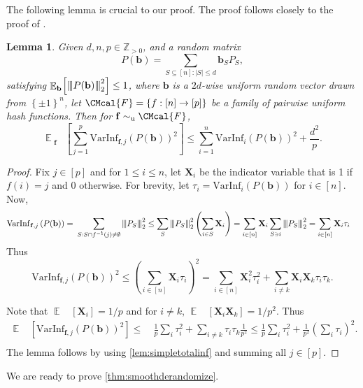 \documentclass[10pt,a4paper]{article}
\def\F{\CMcal{F}}
\theoremstyle{plain}
\newtheorem{lemma}[theorem]{Lemma}
\theoremstyle{definition}
\newcommand {\minusspace} {\: \! \!}
\newcommand {\Fn} [2] {\ensuremath{ #1 \minusspace \Br{ #2 } }}
\newcommand {\set} [1] {\ensuremath{ \left\lbrace #1 \right\rbrace }}
\newcommand {\br} [1] {\ensuremath{ \left( #1 \right) }}
\newcommand {\Br} [1] {\ensuremath{ \left[ #1 \right] }}
\newcommand {\ab} [1] {\ensuremath{ \left| #1 \right| }}
\DeclareMathOperator*{\bigE}{\mathbb{E}}
\newcommand {\expec} [2] {\Fn{\bigE_{\substack{#1}}}{#2}}
\newcommand{\nnorm}[1]{{\left\vert\kern-0.25ex\left\vert\kern-0.25ex\left\vert #1
		\right\vert\kern-0.25ex\right\vert\kern-0.25ex\right\vert}}
\newcommand{\posint}{{\mathbb Z}_{>0}}
\newcommand{\randb}{\ensuremath{\mathbf{b}}}
\newcommand{\randf}{\ensuremath{\mathbf{f}}}
\newcommand{\randX}{\ensuremath{\mathbf{X}}}
\newcommand{\varinfi}[1]{\ensuremath{\mathrm{VarInf}_i}\br{#1}}
\newcommand{\infrfj}[1]{\ensuremath{\mathrm{VarInf}_{\randf,j}}\br{#1}}
\newcommand{\invf}[1]{\ensuremath{f^{-1}\br{#1}}}
\newcommand{\usim}{\ensuremath{\sim_{\mathrm{u}}}}
\newcommand{\1}{\mathbb{1}} %
\begin{document}
The following lemma is crucial to our proof. The proof follows closely to the proof of \cite[Lemma 5.4]{10.1145/1806689.1806749}.

\begin{lemma}\label{fact:totalinfsqr}
Given $d,n,p\in\posint$, and a random matrix
\[P(\randb)=\sum_{S\subseteq[n]:\ab{S}\leq d}\randb_SP_S,\]
satisfying $\expec{\randb}{\nnorm{P(\randb)}_2^2}\leq1$, 
where $\randb$ is a $2d$-wise uniform random vector drawn from $\set{\pm 1}^n$, let $\F=\set{f:[n]\to[p]}$ be a family of pairwise uniform hash functions. Then for $\randf\usim\F$,
\[\expec{\randf}{\sum_{j=1}^p\infrfj{P(\randb)}^2}\leq\sum_{i=1}^n\varinfi{P(\randb)}^2+\frac{d^2}{p}.\]
\end{lemma}

\begin{proof}
    Fix $j\in[p]$ and for $1\leq i\leq n$, let $\randX_i$ be the indicator variable that is 1 if $f(i)=j$ and 0 otherwise. For brevity, let $\tau_i=\varinfi{P(\randb)}$ for $i\in[n]$. Now,
    \begin{align*}
        \infrfj{P(\randb)}=~&\sum_{S:S\cap\invf{j}\ne\emptyset}\nnorm{P_S}_2^2
\leq\sum_{S}\nnorm{P_S}_2^2\br{\sum_{i\in S}\randX_i}
=\sum_{i\in [n]}\randX_i\sum_{S\ni i}\nnorm{P_S}_2^2
=\sum_{i\in [n]}\randX_i\tau_i
    \end{align*}
    Thus
\[\infrfj{P(\randb)}^2\leq\br{\sum_{i\in [n]}\randX_i\tau_i}^2=\sum_{i\in[n]}\randX_i^2\tau_i^2+\sum_{i\ne k}\randX_i\randX_k\tau_i\tau_k.\]

    Note that $\expec{}{\randX_i}=1/p$ and for $i\ne k$, $\expec{}{\randX_i\randX_k}=1/p^2$. Thus
    \begin{align*}
        \expec{}{\infrfj{P(\randb)}^2}\leq~&\frac{1}{p}\sum_i\tau_i^2+\sum_{i\ne k}\tau_i\tau_k\frac{1}{p^2}\leq\frac{1}{p}\sum_i\tau_i^2+\frac{1}{p^2}\br{\sum_i\tau_i}^2.\\
    \end{align*}
    The lemma follows by using \cref{lem:simpletotalinf} and summing all $j\in[p].$
\end{proof}


We are ready to prove \cref{thm:smoothderandomize}.
\end{document}

